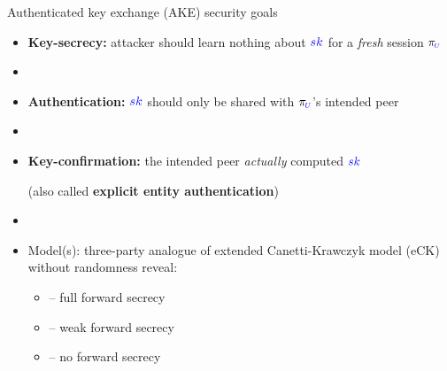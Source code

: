 \documentclass[xcolor={dvipsnames},screen,compress]{beamer}
\providecommand{\oracle}[1]{\pi_{\hspace*{-1pt}#1}}
\providecommand{\dlog}[2]{\textcolor{#1}{#2}}
\providecommand{\ub}[1]{\dlog{blue}{#1}}
\begin{document}
\begin{frame}{Authenticated key exchange (AKE) security goals}
	\begin{itemize}
		\item \textbf{Key-secrecy:} attacker should learn nothing about $\ub{sk}$ for a \emph{fresh} session {\Large$\oracle{{\scriptscriptstyle\ub{U}}}$}
								
		
		\item[]
		
		\item \textbf{Authentication:} $\ub{sk}$ should only be shared with {\Large$\oracle{{\scriptscriptstyle\ub{U}}}$}'s intended peer
		 
		\item[]
	
		\item<2-> \textbf{Key-confirmation:} the intended peer \emph{actually} computed $\ub{sk}$
		
		(also called \textbf{explicit entity authentication})
		
		\item[]
	
		\item<2->
		Model(s): three-party analogue of extended Canetti-Krawczyk model (eCK) without randomness reveal:
			\begin{itemize}
				\item[]  -- full forward secrecy 
				\item[]  -- weak forward secrecy
				\item[]  -- no forward secrecy
			\end{itemize}

	
	\end{itemize}
\end{frame}
\end{document}
